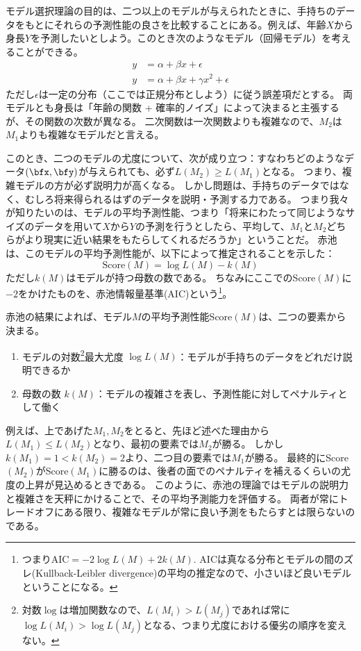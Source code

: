 \documentclass{jsarticle}
\begin{document}
モデル選択理論の目的は、二つ以上のモデルが与えられたときに、手持ちのデータをもとにそれらの予測性能の良さを比較することにある。例えば、年齢$X$から身長$Y$を予測したいとしよう。このとき次のようなモデル（回帰モデル）を考えることができる。
\begin{align}
 y &= \alpha + \beta x + \epsilon \tag{$M_1$}\\ 
 y &= \alpha + \beta x + \gamma x^2 + \epsilon \tag{$M_2$}
\end{align}
ただし$\epsilon$は一定の分布（ここでは正規分布としよう）に従う誤差項だとする。
両モデルとも身長は「年齢の関数 + 確率的ノイズ」によって決まると主張するが、その関数の次数が異なる。
二次関数は一次関数よりも複雑なので、$M_2$は$M_1$よりも複雑なモデルだと言える。

このとき、二つのモデルの尤度について、次が成り立つ：すなわちどのようなデータ$(\bfx, \bfy)$が与えられても、必ず$L(M_2) \geq L(M_1)$となる。
つまり、複雑モデルの方が必ず説明力が高くなる。
しかし問題は、手持ちのデータではなく、むしろ将来得られるはずのデータを説明・予測する力である。
つまり我々が知りたいのは、モデルの平均予測性能、つまり「将来にわたって同じようなサイズのデータを用いて$X$から$Y$の予測を行うとしたら、平均して、$M_1$と$M_2$どちらがより現実に近い結果をもたらしてくれるだろうか」ということだ。
赤池は、このモデルの平均予測性能が、以下によって推定されることを示した：
\[
 \text{Score}(M) = \log L(M) - k(M) 
\]
ただし$k(M)$はモデルが持つ母数の数である。
ちなみにここでのScore$(M)$に$-2$をかけたものを、赤池情報量基準(AIC)という\footnote{つまりAIC$=-2\log L(M) + 2k(M)$. AICは真なる分布とモデルの間のズレ(Kullback-Leibler divergence)の平均の推定なので、小さいほど良いモデルということになる。}。

赤池の結果によれば、モデル$M$の平均予測性能Score$(M)$は、二つの要素から決まる。
\begin{enumerate}
 \item モデルの対数\footnote{対数$\log$は増加関数なので、$L(M_i) > L(M_j)$であれば常に$\log L(M_i) > \log L(M_j)$となる、つまり尤度における優劣の順序を変えない。}最大尤度 $\log L(M)$：モデルが手持ちのデータをどれだけ説明できるか
 \item 母数の数 $k(M)$：モデルの複雑さを表し、予測性能に対してペナルティとして働く
\end{enumerate}
例えば、上であげた$M_1, M_2$をとると、先ほど述べた理由から$L(M_1) \leq L(M_2)$となり、最初の要素では$M_2$が勝る。
しかし$k(M_1) = 1 < k(M_2) = 2$より、二つ目の要素では$M_1$が勝る。
最終的にScore$(M_2)$がScore$(M_1)$に勝るのは、後者の面でのペナルティを補えるくらいの尤度の上昇が見込めるときである。
このように、赤池の理論ではモデルの説明力と複雑さを天秤にかけることで、その平均予測能力を評価する。
両者が常にトレードオフにある限り、複雑なモデルが常に良い予測をもたらすとは限らないのである。
\end{document}
